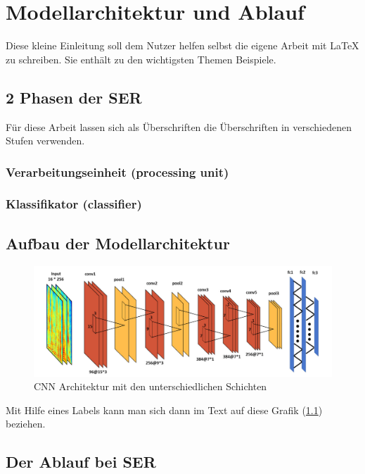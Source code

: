 \chapter{Modellarchitektur und Ablauf}

Diese kleine Einleitung soll dem Nutzer helfen selbst die eigene Arbeit mit \LaTeX{} zu schreiben. Sie enthält zu den wichtigsten Themen Beispiele.


\section{2 Phasen der SER}

Für diese Arbeit lassen sich als Überschriften die Überschriften in verschiedenen Stufen verwenden.

\subsection{Verarbeitungseinheit (processing unit)}
\subsection{Klassifikator (classifier)}


\section{Aufbau der Modellarchitektur}


\begin{figure}[ht]
    \centering
    \includegraphics[width=1\textwidth]{images/conv}
    \caption{\label{architektur}CNN Architektur mit den unterschiedlichen Schichten \cite{badshah2019deep}}
\end{figure}

Mit Hilfe eines Labels kann man sich dann im Text auf diese Grafik (\ref{architektur}) beziehen. 



\section{Der Ablauf bei SER}

